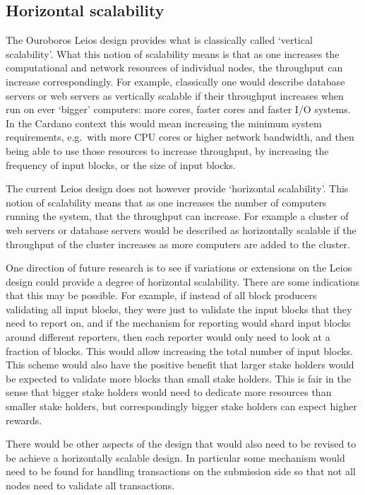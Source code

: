 \documentclass[11pt,a4paper]{article}
\begin{document}
\subsection{Horizontal scalability}

The Ouroboros Leios design provides what is classically called `vertical
scalability'. What this notion of scalability means is that as one increases
the computational and network resources of individual nodes, the throughput can
increase correspondingly. For example, classically one would describe database
servers or web servers as vertically scalable if their throughput increases
when run on ever `bigger' computers: more cores, faster cores and faster
I/O systems. In the Cardano context this would mean increasing the minimum
system requirements, e.g.~with more CPU cores or higher network bandwidth,
and then being able to use those resources to increase throughput, by
increasing the frequency of input blocks, or the size of input blocks.

The current Leios design does not however provide `horizontal scalability'.
This notion of scalability means that as one increases the number of computers
running the system, that the throughput can increase. For example a cluster of
web servers or database servers would be described as horizontally scalable if
the throughput of the cluster increases as more computers are added to the
cluster.

One direction of future research is to see if variations or extensions on the
Leios design could provide a degree of horizontal scalability. There are some
indications that this may be possible. For example, if instead of all block
producers validating all input blocks, they were just to validate the input
blocks that they need to report on, and if the mechanism for reporting would
shard input blocks around different reporters, then each reporter would only
need to look at a fraction of blocks. This would allow increasing the total
number of input blocks. This scheme would also have the positive benefit that
larger stake holders would be expected to validate more blocks than small
stake holders. This is fair in the sense that bigger stake holders would need
to dedicate more resources than smaller stake holders, but correspondingly
bigger stake holders can expect higher rewards.

There would be other aspects of the design that would also need to be revised
to be achieve a horizontally scalable design. In particular some mechanism
would need to be found for handling transactions on the submission side so that
not all nodes need to validate all transactions.
\end{document}
